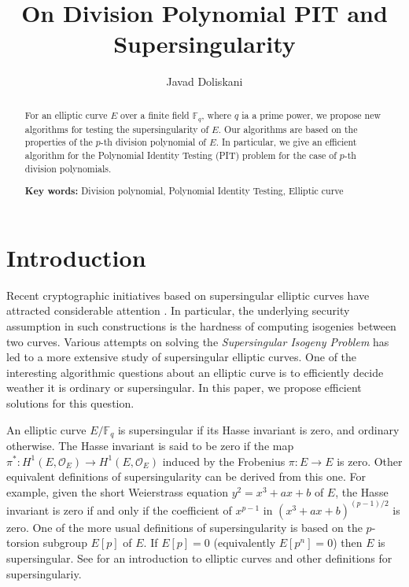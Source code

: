 \documentclass[12pt]{article}
\title{On Division Polynomial PIT and Supersingularity}
\author[1]{Javad Doliskani}
\affil[1]{\small Institute for Quantum Computing, University of Waterloo}
\date{}
\theoremstyle{plain}
\theoremstyle{definition}
\def\F{\ensuremath{\mathbb{F}}}
\begin{document}
\maketitle

\begin{abstract}
	\noindent For an elliptic curve $E$ over a finite field $\F_q$, where $q$ ia a prime power, we 
	propose new algorithms for testing the supersingularity of $E$. Our algorithms are based on the 
	properties of the $p$-th division polynomial of $E$. In particular, we give an efficient 
	algorithm for the Polynomial Identity Testing (PIT) problem for the case of $p$-th division 
	polynomials.
	
	\vspace*{1cm}
	\noindent\textbf{Key words:} Division polynomial, Polynomial Identity Testing, Elliptic curve
\end{abstract}



\section{Introduction}
\label{sec:intro}

Recent cryptographic initiatives based on supersingular elliptic curves have attracted considerable 
attention \cite{Jao2011, Jao2014, Charles2009}. In particular, the underlying security assumption 
in such constructions is the hardness of computing isogenies between two curves. Various attempts 
on solving the \textit{Supersingular Isogeny Problem} has led to a more extensive study of 
supersingular elliptic curves. One of the interesting algorithmic questions about an elliptic curve 
is to efficiently decide weather it is ordinary or supersingular. In this paper, we propose 
efficient solutions for this question.

An elliptic curve $E / \F_q$ is supersingular if its Hasse invariant is zero, and ordinary 
otherwise. The Hasse invariant is said to be zero if the map $\pi^*: H^1(E, \mathscr{O}_E) 
\rightarrow H^1(E, \mathscr{O}_E)$ induced by the Frobenius $\pi: E \rightarrow E$ is zero. Other 
equivalent definitions of supersingularity can be derived from this one. For example, given the 
short Weierstrass equation $y^2 = x^3 + ax + b$ of $E$, the Hasse invariant is zero if and only if 
the coefficient of $x^{p - 1}$ in $(x^3 + ax + b)^{(p - 1) / 2}$ is zero. One of the more usual 
definitions of supersingularity is based on the $p$-torsion subgroup $E[p]$ of $E$. If $E[p] = 0$ 
(equivalently $E[p^n] = 0$) then $E$ is supersingular. See \cite{Husemoeller1987} for an 
introduction to elliptic curves and other definitions for supersingulariy. 
\end{document}
